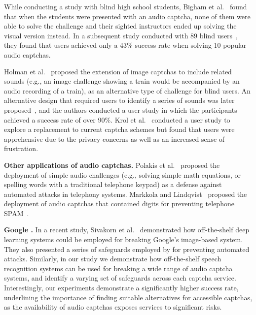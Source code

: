 While conducting a study with blind high school students, Bigham et al.~\cite{bigham2008inspiring}
found that when the students were presented with an audio captcha, none of them were able to solve the challenge 
and their sighted instructors ended up solving the visual version instead. In a subsequent
study conducted with 89 blind users~\cite{bigham2009evaluating}, they found that users achieved 
only a 43\% success rate when solving 10 popular audio captchas.

Holman et al.~\cite{holman2007developing} proposed the extension of image captchas to include related
sounds (e.g., an image challenge showing a train would be accompanied by an audio recording of a train), 
as an alternative type of challenge for blind users. An alternative design that required users to identify 
a series of sounds was later proposed~\cite{Lazar:2012}, and the authors conducted a user study in which the
participants achieved a success rate of over 90\%. Krol et al.~\cite{krol2016better} conducted a user study 
to explore a replacement to current captcha schemes but found that users were apprehensive due to the privacy 
concerns as well as an increased sense of frustration.

\textbf{Other applications of audio captchas.} Polakis et al.~\cite{polakis:syssec11} proposed the deployment of 
simple audio challenges (e.g., solving simple math equations, or spelling words with a traditional telephone keypad)
as a defense against automated attacks in telephony systems. Markkola and Lindqvist~\cite{markkola2008accessible}
proposed the deployment of audio captchas that contained digits for preventing telephone SPAM~\cite{sok-robocalls}.

\textbf{Google \re.} In a recent study, Sivakorn et al.~\cite{sivakorn:eurosp16} demonstrated how off-the-shelf 
deep learning systems could be employed for breaking Google's image-based \re system. They also presented a series 
of safeguards employed by \re for preventing automated attacks. Similarly, in our study we demonstrate how off-the-shelf 
speech recognition systems can be used for breaking a wide range of audio captcha systems, and identify a varying set
of safeguards across each captcha service. Interestingly, our experiments demonstrate a significantly higher success rate,
underlining the importance of finding suitable alternatives for accessible captchas, as the availability of audio captchas 
exposes services to significant risks.
